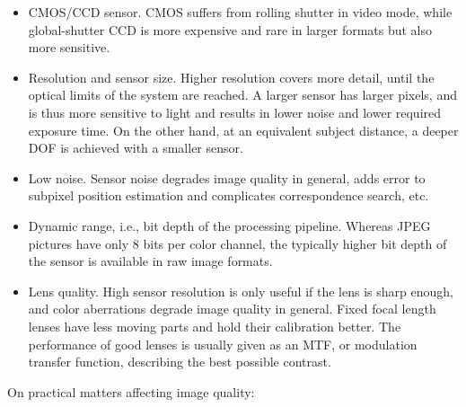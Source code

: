 \begin{itemize}
	\item CMOS/CCD sensor. CMOS suffers from rolling shutter in video mode, while global-shutter CCD is more expensive and rare in larger formats but also more sensitive.

	\item Resolution and sensor size. Higher resolution covers more detail, until the optical limits of the system are reached. A larger sensor has larger pixels, and is thus more sensitive to light and results in lower noise and lower required exposure time. On the other hand, at an equivalent subject distance, a deeper DOF is achieved with a smaller sensor.

	\item Low noise. Sensor noise degrades image quality in general, adds error to subpixel position estimation and complicates correspondence search, etc.

	\item Dynamic range, i.e., bit depth of the processing pipeline. Whereas JPEG pictures have only 8 bits per color channel, the typically higher bit depth of the sensor is available in raw image formats.  %

	\item Lens quality. High sensor resolution is only useful if the lens is sharp enough, and color aberrations degrade image quality in general. Fixed focal length lenses have less moving parts and hold their calibration better. The performance of good lenses is usually given as an MTF, or modulation transfer function, describing the best possible contrast.
\end{itemize}

On practical matters affecting image quality:

